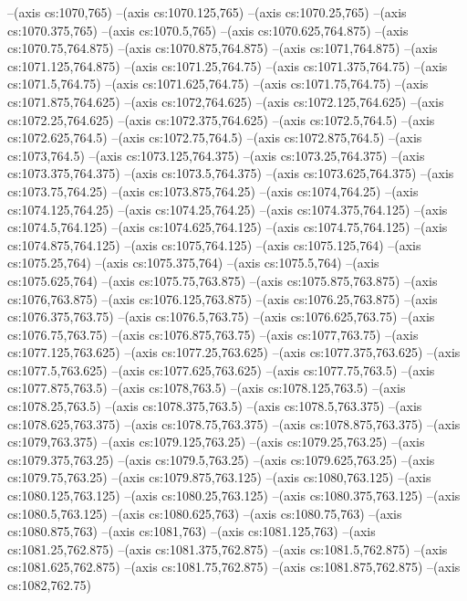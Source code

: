 --(axis cs:1070,765)
--(axis cs:1070.125,765)
--(axis cs:1070.25,765)
--(axis cs:1070.375,765)
--(axis cs:1070.5,765)
--(axis cs:1070.625,764.875)
--(axis cs:1070.75,764.875)
--(axis cs:1070.875,764.875)
--(axis cs:1071,764.875)
--(axis cs:1071.125,764.875)
--(axis cs:1071.25,764.75)
--(axis cs:1071.375,764.75)
--(axis cs:1071.5,764.75)
--(axis cs:1071.625,764.75)
--(axis cs:1071.75,764.75)
--(axis cs:1071.875,764.625)
--(axis cs:1072,764.625)
--(axis cs:1072.125,764.625)
--(axis cs:1072.25,764.625)
--(axis cs:1072.375,764.625)
--(axis cs:1072.5,764.5)
--(axis cs:1072.625,764.5)
--(axis cs:1072.75,764.5)
--(axis cs:1072.875,764.5)
--(axis cs:1073,764.5)
--(axis cs:1073.125,764.375)
--(axis cs:1073.25,764.375)
--(axis cs:1073.375,764.375)
--(axis cs:1073.5,764.375)
--(axis cs:1073.625,764.375)
--(axis cs:1073.75,764.25)
--(axis cs:1073.875,764.25)
--(axis cs:1074,764.25)
--(axis cs:1074.125,764.25)
--(axis cs:1074.25,764.25)
--(axis cs:1074.375,764.125)
--(axis cs:1074.5,764.125)
--(axis cs:1074.625,764.125)
--(axis cs:1074.75,764.125)
--(axis cs:1074.875,764.125)
--(axis cs:1075,764.125)
--(axis cs:1075.125,764)
--(axis cs:1075.25,764)
--(axis cs:1075.375,764)
--(axis cs:1075.5,764)
--(axis cs:1075.625,764)
--(axis cs:1075.75,763.875)
--(axis cs:1075.875,763.875)
--(axis cs:1076,763.875)
--(axis cs:1076.125,763.875)
--(axis cs:1076.25,763.875)
--(axis cs:1076.375,763.75)
--(axis cs:1076.5,763.75)
--(axis cs:1076.625,763.75)
--(axis cs:1076.75,763.75)
--(axis cs:1076.875,763.75)
--(axis cs:1077,763.75)
--(axis cs:1077.125,763.625)
--(axis cs:1077.25,763.625)
--(axis cs:1077.375,763.625)
--(axis cs:1077.5,763.625)
--(axis cs:1077.625,763.625)
--(axis cs:1077.75,763.5)
--(axis cs:1077.875,763.5)
--(axis cs:1078,763.5)
--(axis cs:1078.125,763.5)
--(axis cs:1078.25,763.5)
--(axis cs:1078.375,763.5)
--(axis cs:1078.5,763.375)
--(axis cs:1078.625,763.375)
--(axis cs:1078.75,763.375)
--(axis cs:1078.875,763.375)
--(axis cs:1079,763.375)
--(axis cs:1079.125,763.25)
--(axis cs:1079.25,763.25)
--(axis cs:1079.375,763.25)
--(axis cs:1079.5,763.25)
--(axis cs:1079.625,763.25)
--(axis cs:1079.75,763.25)
--(axis cs:1079.875,763.125)
--(axis cs:1080,763.125)
--(axis cs:1080.125,763.125)
--(axis cs:1080.25,763.125)
--(axis cs:1080.375,763.125)
--(axis cs:1080.5,763.125)
--(axis cs:1080.625,763)
--(axis cs:1080.75,763)
--(axis cs:1080.875,763)
--(axis cs:1081,763)
--(axis cs:1081.125,763)
--(axis cs:1081.25,762.875)
--(axis cs:1081.375,762.875)
--(axis cs:1081.5,762.875)
--(axis cs:1081.625,762.875)
--(axis cs:1081.75,762.875)
--(axis cs:1081.875,762.875)
--(axis cs:1082,762.75)
